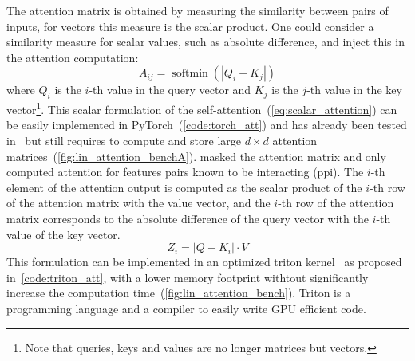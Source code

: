 \documentclass[../main.tex]{subfiles}
\begin{document}
		The attention matrix is obtained by measuring the similarity between pairs of inputs, for vectors this measure is the scalar product.
		One could consider a similarity measure for scalar values, such as absolute difference, and inject this in the attention computation:
		\begin{equation}
			A_{ij} = \operatorname{softmin}\left(\left|Q_{i} - K_{j} \right| \right) \label{eq:scalar_attention}
		\end{equation}
		where \(Q_{i}\) is the \(i\)-th value in the query vector and \(K_{j}\) is the \(j\)-th value in the key vector\footnote{Note that queries, keys and values are no longer matrices but vectors.}.
		This scalar formulation of the self-attention~(\cref{eq:scalar_attention}) can be easily implemented in PyTorch~(\cref{code:torch_att}) and has already been tested in~\cite{Lacan2023} but still requires to compute and store large \(d\times d\) attention matrices~(\cref{fig:lin_attention_benchA}).
		\citeauthor{Lacan2023} masked the attention matrix and only computed attention for features pairs known to be interacting (\gls{ppi})\cite{Lacan2023}.
		The \(i\)-th element of the attention output is computed as the scalar product of the \(i\)-th row of the attention matrix with the value vector, and the \(i\)-th row of the attention matrix corresponds to the absolute difference of the query vector with the \(i\)-th value of the key vector.
		\begin{equation}
			Z_{i} = \left| Q - K_{i} \right| \cdot V
		\end{equation}
		This formulation can be implemented in an optimized triton kernel~\cite{TritonLang} as proposed in~\cref{code:triton_att}, with a lower memory footprint withtout significantly increase the computation time~(\cref{fig:lin_attention_bench}).
		Triton is a programming language and a compiler to easily write GPU efficient code.
\end{document}

